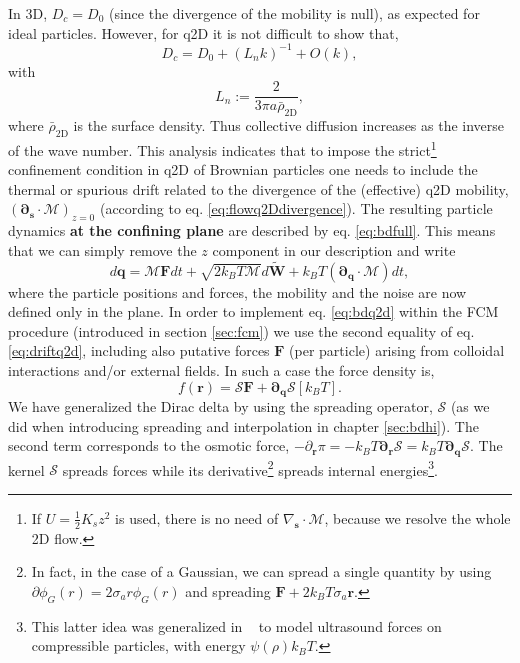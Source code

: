 \documentclass[ twoside,openright,titlepage,numbers=noenddot,%
headinclude,footinclude,cleardoublepage=empty,abstract=on,
BCOR=5mm,paper=b5,fontsize=11pt, dvipsnames
]{scrreprt}
\renewcommand{\vec}[1]{\bm{#1}}
\newcommand{\tens}[1]{\bm{\mathcal{#1}}}
\newcommand{\oper}[1]{\mathcal{#1}}
\newcommand{\kT}{k_B T}
\newcommand{\half}{\frac{1}{2}}
\newcommand{\ppos}{q}
\newcommand{\fpos}{r}
\begin{document}
In 3D, $D_c = D_0$ (since the divergence of the mobility is null), as expected for ideal particles. However, for q2D it is not difficult to show \cite{Bleibel2017, Pelaez2018} that,
\begin{equation}
  D_c = D_0 + (L_nk)^{-1} + O(k),
\end{equation}
with
\begin{equation}
  L_n := \frac{2}{3\pi a\bar{\rho}_{\text{2D}}},
\end{equation}
where $\bar{\rho}_{\text{2D}}$ is the surface density. Thus collective diffusion increases as the inverse of the wave number.
This analysis indicates that  to impose the strict\footnote{If $U=\half K_sz^2$ is used, there is no need of $\nabla_{\vec{s}}\cdot\tens{M}$, because we resolve the whole 2D flow.} confinement condition in q2D of Brownian particles one needs to include the thermal or spurious drift related to the divergence of the (effective) q2D mobility, $(\vec{\partial}_{\vec{s}}\cdot\tens{M})_{z=0}$ (according to eq. \eqref{eq:flowq2Ddivergence}). The resulting particle dynamics \textbf{at the confining plane} are described by eq. \eqref{eq:bdfull}.
This means that we can simply remove the $z$ component in our description and write
\begin{equation}
  \label{eq:bdq2d}
  d\vec{\ppos} = \tens{M}\vec{F}dt + \sqrt{2\kT \tens{M}}d\vec{\widetilde{W}} + \kT\left(\vec{\partial}_{\vec{\ppos}}\cdot\tens{M}\right)dt,
\end{equation}
where the particle positions and forces, the mobility and the noise are now defined only in the plane.
In order to implement eq. \eqref{eq:bdq2d} within the \gls{FCM} procedure (introduced in section \ref{sec:fcm}) we use the second equality of eq. \eqref{eq:driftq2d}, including also putative forces $\vec{F}$ (per particle) arising from colloidal interactions and/or external fields. In such a case the force density is,
\begin{equation}
  f(\vec{\fpos}) = \oper{S}\vec{F} + \vec{\partial}_{\vec{\ppos}}\oper{S}\left[\kT\right].
\end{equation}
We have generalized the Dirac delta by using the spreading operator, $\oper{S}$ (as we did when introducing spreading and interpolation in chapter \ref{sec:bdhi}). The second term corresponds to the osmotic force, $-\partial_{\vec{\fpos}}\pi = -\kT\vec{\partial}_{\vec{\fpos}}\oper{S} = \kT\vec{\partial}_{\vec{\ppos}}\oper{S}$. The kernel $\oper{S}$ spreads forces while its derivative\footnote{In fact, in the case of a Gaussian, we can spread a single quantity by using $\partial\phi_G(r) = 2\sigma_ar\phi_G(r)$ and spreading $\vec{F} + 2\kT\sigma_a\vec{r}$.} spreads internal energies\footnote{This latter idea was generalized in ~\cite{Balboa2013} to model ultrasound forces on compressible particles, with energy $\psi(\rho)\kT$.}.
\end{document}
